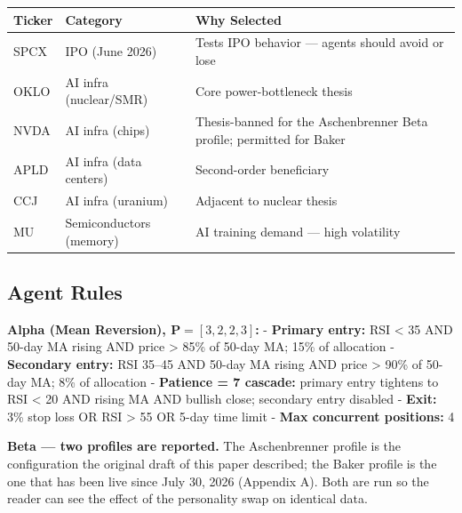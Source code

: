 \documentclass[11pt]{article}
\begin{document}
{\def\LTcaptype{none} %
{\small
\begin{longtable}{@{}
  >{\raggedright\arraybackslash}p{}
  >{\raggedright\arraybackslash}p{}
  >{\raggedright\arraybackslash}p{}@{}}
\toprule\noalign{}
\begin{minipage}[b]{\linewidth}\raggedright
Ticker
\end{minipage} & \begin{minipage}[b]{\linewidth}\raggedright
Category
\end{minipage} & \begin{minipage}[b]{\linewidth}\raggedright
Why Selected
\end{minipage} \\
\midrule\noalign{}
\endhead
\bottomrule\noalign{}
\endlastfoot
\renewcommand{\arraystretch}{1.15}
SPCX & IPO (June 2026) & Tests IPO behavior --- agents should avoid or lose \\
OKLO & AI infra (nuclear/SMR) & Core power-bottleneck thesis \\
NVDA & AI infra (chips) & Thesis-banned for the Aschenbrenner Beta profile; permitted for Baker \\
APLD & AI infra (data centers) & Second-order beneficiary \\
CCJ & AI infra (uranium) & Adjacent to nuclear thesis \\
MU & Semiconductors (memory) & AI training demand --- high volatility \\
\end{longtable}}
}

\subsection{Agent Rules}\label{agent-rules}

\textbf{Alpha (Mean Reversion), \(\mathbf{P} = [3,2,2,3]\):} - \textbf{Primary entry:} RSI \textless{} 35 AND 50-day MA rising AND price \textgreater{} 85\% of 50-day MA; 15\% of allocation - \textbf{Secondary entry:} RSI 35--45 AND 50-day MA rising AND price \textgreater{} 90\% of 50-day MA; 8\% of allocation - \textbf{Patience = 7 cascade:} primary entry tightens to RSI \textless{} 20 AND rising MA AND bullish close; secondary entry disabled - \textbf{Exit:} 3\% stop loss OR RSI \textgreater{} 55 OR 5-day time limit - \textbf{Max concurrent positions:} 4

\textbf{Beta --- two profiles are reported.} The Aschenbrenner profile is the configuration the original draft of this paper described; the Baker profile is the one that has been live since July 30, 2026 (Appendix A). Both are run so the reader can see the effect of the personality swap on identical data.
\end{document}
